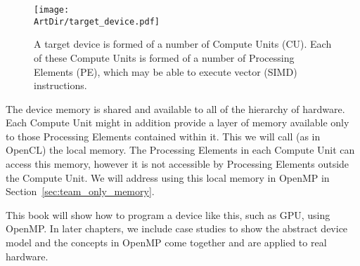 \begin{figure}[t]
\centerline{\texttt{[image: \\ArtDir/target\_device.pdf]}}
\caption{A target device is formed of a number of Compute Units (CU). Each of these Compute Units is formed of a number of Processing Elements (PE), which may be able to execute vector (SIMD) instructions.}
\label{figure:target_device_hierarchy}
\end{figure}

The device memory is shared and available to all of the hierarchy of hardware.
Each Compute Unit might in addition provide a layer of memory available only to those Processing Elements contained within it.
This we will call (as in OpenCL) the local memory.
The Processing Elements in each Compute Unit can access this memory, however it is not accessible by Processing Elements outside the Compute Unit.
We will address using this local memory in OpenMP in Section~\ref{sec:team_only_memory}.

This book will show how to program a device like this, such as GPU, using OpenMP.
In later chapters, we include case studies to show the abstract device model and the concepts in OpenMP come together and are applied to real hardware.





